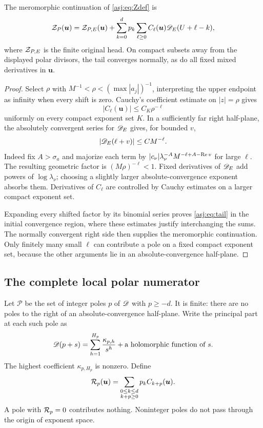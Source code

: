 \begin{lemma}\label{asj:thm:tail}
The meromorphic continuation of \eqref{asj:eq:Zdef} is
\begin{equation}\label{asj:eq:tail}
 \mathcal Z_P(\boldsymbol u)=
 \mathcal Z_{P,E}(\boldsymbol u)
 +\sum_{k=0}^d p_k\sum_{\ell\ge0}
          C_\ell(\boldsymbol u)\mathscr D_E(U+\ell-k),
\end{equation}
where $\mathcal Z_{P,E}$ is the finite original head. On compact subsets away
from the displayed polar divisors, the tail converges normally, as do
all fixed mixed derivatives in $\boldsymbol u$.
\end{lemma}
\begin{proof}
Select $\rho$ with $M^{-1}<\rho<(\max|a_j|)^{-1}$, interpreting the upper
endpoint as infinity when every shift is zero. Cauchy's coefficient estimate
on $|z|=\rho$ gives
\[
 |C_\ell(\boldsymbol u)|\le C_K\rho^{-\ell}
\]
uniformly on every compact exponent set $K$. In a sufficiently far right
half-plane, the absolutely convergent series for $\mathscr D_E$ gives, for bounded $v$,
\[
 |\mathscr D_E(\ell+v)|\le C M^{-\ell}.
\]
Indeed fix $A>\sigma_a$ and majorize each term by
$|c_\nu|\lambda_\nu^{-A}M^{-\ell+A-\operatorname{Re} v}$ for large $\ell$.
The resulting geometric factor is $(M\rho)^{-\ell}<1$.
Fixed derivatives of $\mathscr D_E$ add powers of $\log\lambda_\nu$; choosing a
slightly larger absolute-convergence exponent absorbs them. Derivatives of
$C_\ell$ are controlled by Cauchy estimates on a larger compact exponent set.

Expanding every shifted factor by its binomial series proves
\eqref{asj:eq:tail} in the initial convergence region, where these estimates
justify interchanging the sums. The normally convergent right side then
supplies the meromorphic continuation. Only finitely many small $\ell$
can contribute a pole on a fixed compact exponent set, because the other
arguments lie in an absolute-convergence half-plane.
\end{proof}

\subsection{The complete local polar numerator}
Let $\mathcal P$ be the set of integer poles $p$ of $\mathscr D$ with $p\ge-d$.
It is finite: there are no poles to the right of an absolute-convergence
half-plane. Write the principal part at each such pole as
\begin{equation}\label{asj:eq:principal}
 \mathscr D(p+s)=\sum_{h=1}^{H_p}\frac{\kappa_{p,h}}{s^h}
                      +\text{a holomorphic function of }s.
\end{equation}
The highest coefficient $\kappa_{p,H_p}$ is nonzero. Define
\begin{equation}\label{asj:eq:Rdef}
 \mathcal R_p(\boldsymbol u)=
       \sum_{\substack{0\le k\le d\\k+p\ge0}}p_k C_{k+p}(\boldsymbol u).
\end{equation}
A pole with $\mathcal R_p=0$ contributes nothing. Noninteger poles do not pass
through the origin of exponent space.

